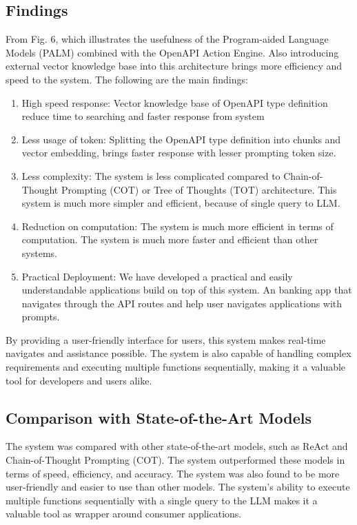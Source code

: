 \documentclass[conference]{IEEEtran}
\begin{document}
\subsection{Findings}
From Fig. 6, which illustrates the usefulness of the Program-aided Language
Models (PALM) combined with the OpenAPI Action Engine. Also introducing
external vector knowledge base into this architecture brings more efficiency
and speed to the system. The following are the main findings:
\begin{enumerate}
    \item  High speed response: Vector knowledge base of OpenAPI type definition reduce
          time to searching and faster response from system
    \item Less usage of token: Splitting the OpenAPI type definition into chunks and
          vector embedding, brings faster response with lesser prompting token size.
    \item Less complexity: The system is less complicated compared to Chain-of-Thought
          Prompting (COT) or Tree of Thoughts (TOT) architecture. This system is much
          more simpler and efficient, because of single query to LLM.
    \item Reduction on computation: The system is much more efficient in terms of
          computation. The system is much more faster and efficient than other systems.
    \item Practical Deployment: We have developed a practical and easily understandable
          applications build on top of this system. An banking app that navigates through
          the API routes and help user navigates applications with prompts.
\end{enumerate}

By providing a user-friendly interface for users, this system makes real-time
navigates and assistance possible. The system is also capable of handling
complex requirements and executing multiple functions sequentially, making it a
valuable tool for developers and users alike.

\subsection{Comparison with State-of-the-Art Models}
The system was compared with other state-of-the-art models, such as ReAct and
Chain-of-Thought Prompting (COT). The system outperformed these models in terms
of speed, efficiency, and accuracy. The system was also found to be more
user-friendly and easier to use than other models. The system's ability to
execute multiple functions sequentially with a single query to the LLM makes it
a valuable tool as wrapper around consumer applications.
\end{document}
